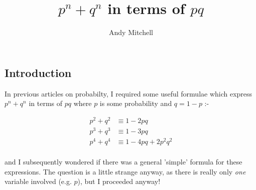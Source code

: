 \documentclass[a4paper,10pt]{article}
\author{Andy Mitchell}
\title{$p^n + q^n$ in terms of $pq$}
\begin{document}
 
\maketitle 
\begin{flushleft}

\section{Introduction}
In previous articles on probabilty, I required some useful formulae which express $p^n + q^n$ in terms of $pq$ where $p$ is some probability and $q = 1-p$ :-

\begin{align*}
p^2 + q^2 &\equiv 1 - 2pq  \\
p^3 + q^3  &\equiv 1 - 3pq  \\
p^4 + q^4  &\equiv 1 - 4pq + 2p^2q^2  \\
\end{align*}
 
and I subsequently wondered if there was a general 'simple' formula for these expressions. 
The question is a little strange anyway, as there is really only \emph{one} variable involved (e.g. $p$), but I proceeded anyway! 


\end{flushleft}
\end{document}
